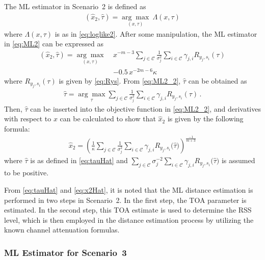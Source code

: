 \documentclass[10pt,twocolumn]{IEEEtran}
\newcommand{\mtC}{{\mathcal{C}}}
\begin{document}
The ML estimator in Scenario~2 is defined as
\begin{gather}\label{eq:ML2}
(\widehat{x}_2,\widehat{\tau})=\underset{(x,\tau)}{\arg\max}~\Lambda(x,\tau)
\end{gather}
where $\Lambda(x,\tau)$ is as in \eqref{eq:loglike2}. After some manipulation, the ML estimator in \eqref{eq:ML2} can be expressed as
\begin{align}\nonumber
(\widehat{x}_2,\widehat{\tau})=\underset{(x,\tau)}{\arg\max}~&x^{-m-3}
\sum_{j\in\mtC}\frac{1}{\sigma_j^2}
\sum_{i\in\mtC}
\gamma_{j,i}R_{y_j,s_i}(\tau)
\\\label{eq:ML2_2}
&-0.5\,x^{-2m-6}\kappa
\end{align}
where $R_{y_j,s_i}(\tau)$ is given by \eqref{eq:Rys}. From \eqref{eq:ML2_2}, $\widehat{\tau}$ can be obtained as
\begin{gather}\label{eq:tauHat}
\widehat{\tau}=\underset{\tau}{\arg\max}
\sum_{j\in\mtC}\frac{1}{\sigma_j^2}
\sum_{i\in\mtC}
\gamma_{j,i}R_{y_j,s_i}(\tau)\,.
\end{gather}
Then, $\widehat{\tau}$ can be inserted into the objective function in \eqref{eq:ML2_2}, and derivatives with respect to $x$ can be calculated to show that $\widehat{x}_2$ is given by the following formula:
\begin{gather}\label{eq:x2Hat}
\widehat{x}_2=\left(\frac{1}{\kappa}\sum_{j\in\mtC}\frac{1}{\sigma_j^2}
\sum_{i\in\mtC}
\gamma_{j,i}R_{y_j,s_i}\big(\widehat{\tau}\big)\right)^{\frac{-1}{m+3}}
\end{gather}
where $\widehat{\tau}$ is as defined in \eqref{eq:tauHat} and $\sum_{j\in\mtC}\sigma_j^{-2}
\sum_{i\in\mtC}
\gamma_{j,i}R_{y_j,s_i}\big(\widehat{\tau}\big)$ is assumed to be positive.

From \eqref{eq:tauHat} and \eqref{eq:x2Hat}, it is noted that the ML distance estimation is performed in two steps in Scenario~2. In the first step, the TOA parameter is estimated. In the second step, this TOA estimate is used to determine the RSS level, which is then employed in the distance estimation process by utilizing the known channel attenuation formulas.


\subsubsection{ML Estimator for Scenario~3}\label{sec:ML3}
\end{document}
